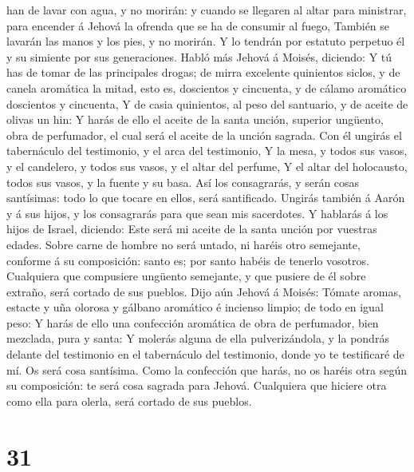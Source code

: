 han de lavar con agua, y no morirán: y cuando se llegaren al altar para
ministrar, para encender á Jehová la ofrenda que se ha de consumir al
fuego,  También se lavarán las manos y los pies, y no
morirán. Y lo tendrán por estatuto perpetuo él y su simiente por sus
generaciones.  Habló más Jehová á Moisés, diciendo:
 Y tú has de tomar de las principales drogas; de mirra
excelente quinientos siclos, y de canela aromática la mitad, esto es,
doscientos y cincuenta, y de cálamo aromático doscientos y cincuenta,
 Y de casia quinientos, al peso del santuario, y de aceite
de olivas un hin:  Y harás de ello el aceite de la santa
unción, superior ungüento, obra de perfumador, el cual será el aceite de
la unción sagrada.  Con él ungirás el tabernáculo del
testimonio, y el arca del testimonio,  Y la mesa, y todos
sus vasos, y el candelero, y todos sus vasos, y el altar del perfume,
 Y el altar del holocausto, todos sus vasos, y la fuente y
su basa.  Así los consagrarás, y serán cosas santísimas:
todo lo que tocare en ellos, será santificado.  Ungirás
también á Aarón y á sus hijos, y los consagrarás para que sean mis
sacerdotes.  Y hablarás á los hijos de Israel, diciendo:
Este será mi aceite de la santa unción por vuestras edades.
 Sobre carne de hombre no será untado, ni haréis otro
semejante, conforme á su composición: santo es; por santo habéis de
tenerlo vosotros.  Cualquiera que compusiere ungüento
semejante, y que pusiere de él sobre extraño, será cortado de sus
pueblos.  Dijo aún Jehová á Moisés: Tómate aromas, estacte
y uña olorosa y gálbano aromático é incienso limpio; de todo en igual
peso:  Y harás de ello una confección aromática de obra de
perfumador, bien mezclada, pura y santa:  Y molerás alguna
de ella pulverizándola, y la pondrás delante del testimonio en el
tabernáculo del testimonio, donde yo te testificaré de mí. Os será cosa
santísima.  Como la confección que harás, no os haréis otra
según su composición: te será cosa sagrada para Jehová. 
Cualquiera que hiciere otra como ella para olerla, será cortado de sus
pueblos.

\hypertarget{section-30}{%
\section{31}\label{section-30}}

